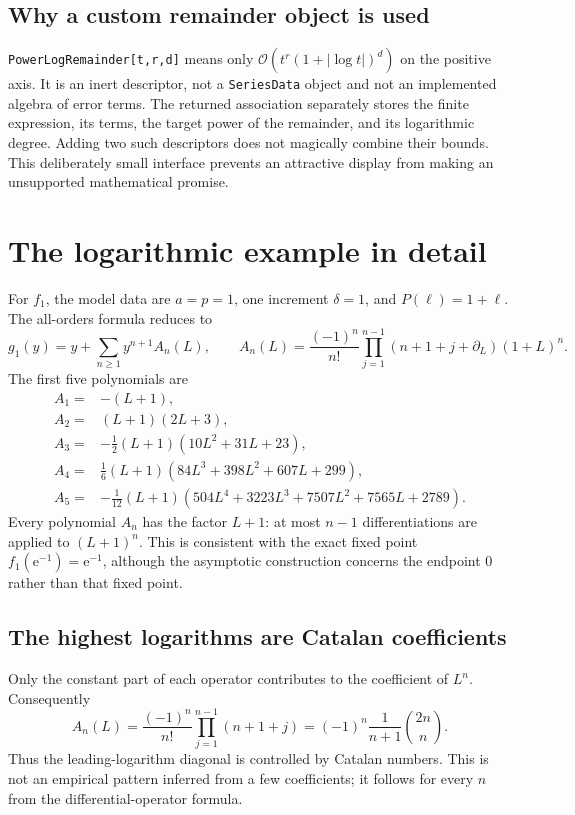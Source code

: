 \documentclass[11pt,a4paper]{article}
\numberwithin{equation}{section}
\theoremstyle{definition}\newtheorem{definition}[theorem]{Definition}
\theoremstyle{remark}\newtheorem{remark}[theorem]{Remark}
\newcommand{\OO}{\mathcal O}\newcommand{\dd}{\mathrm d}
\newcommand{\e}{\mathrm e}
\newcommand{\code}[1]{\texttt{#1}}
\begin{document}
\subsection{Why a custom remainder object is used}

\code{PowerLogRemainder[t,r,d]} means only
$\OO(t^r(1+|\log t|)^d)$ on the positive axis. It is an inert descriptor,
not a \code{SeriesData} object and not an implemented algebra of error
terms. The returned association separately stores the finite expression,
its terms, the target power of the remainder, and its logarithmic degree.
Adding two such descriptors does not magically combine their bounds.
This deliberately small interface prevents an attractive display from
making an unsupported mathematical promise.

\section{The logarithmic example in detail}
\label{sec:log-example}

For $f_1$, the model data are $a=p=1$, one increment $\delta=1$, and
$P(\ell)=1+\ell$. The all-orders formula reduces to
\begin{equation}
 g_1(y)=y+\sum_{n\ge1}y^{n+1}A_n(L),\qquad
 A_n(L)=\frac{(-1)^n}{n!}
 \prod_{j=1}^{n-1}(n+1+j+\partial_L)(1+L)^n.
 \label{eq:log-all}
\end{equation}
The first five polynomials are
\begin{align*}
 A_1={}&-(L+1),\\
 A_2={}&(L+1)(2L+3),\\
 A_3={}&-\tfrac12(L+1)(10L^2+31L+23),\\
 A_4={}&\tfrac16(L+1)(84L^3+398L^2+607L+299),\\
 A_5={}&-\tfrac1{12}(L+1)
   (504L^4+3223L^3+7507L^2+7565L+2789).
\end{align*}
Every polynomial $A_n$ has the factor $L+1$: at most $n-1$
differentiations are applied to $(L+1)^n$. This is consistent with the
exact fixed point $f_1(\e^{-1})=\e^{-1}$, although the asymptotic
construction concerns the endpoint $0$ rather than that fixed point.

\subsection{The highest logarithms are Catalan coefficients}

Only the constant part of each operator contributes to the coefficient
of $L^n$. Consequently
\begin{equation}
 [L^n]A_n(L)=\frac{(-1)^n}{n!}
   \prod_{j=1}^{n-1}(n+1+j)
 =(-1)^n\frac1{n+1}\binom{2n}{n}.
 \label{eq:catalan}
\end{equation}
Thus the leading-logarithm diagonal is controlled by Catalan numbers.
This is not an empirical pattern inferred from a few coefficients; it
follows for every $n$ from the differential-operator formula.
\end{document}

